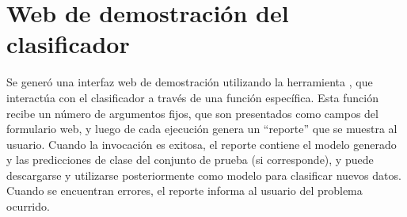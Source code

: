 %
%
\section{Web de demostración del clasificador}
%
Se generó una interfaz web de demostración utilizando la herramienta
\eng{\webdemo{}} \cite{webdemobuilder}, que interactúa con el
clasificador a través de una función específica.
Esta función recibe un número de argumentos fijos, que son presentados
como campos del formulario web, y luego de cada ejecución genera un
``reporte'' que se muestra al usuario.
Cuando la invocación es exitosa, el reporte contiene el modelo
generado y las predicciones de clase del conjunto de prueba (si
corresponde), y puede descargarse y utilizarse posteriormente como
modelo para clasificar nuevos datos.
Cuando se encuentran errores, el reporte informa al usuario del
problema ocurrido.


